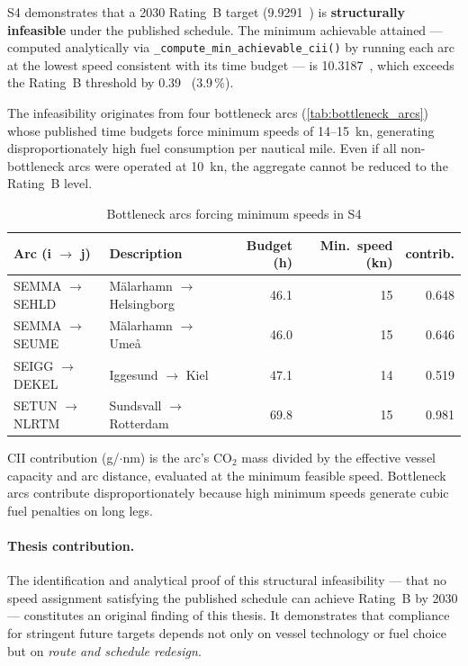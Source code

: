 S4 demonstrates that a 2030 Rating~B \CII{} target (9.9291~\gGTnm{}) is
\textbf{structurally infeasible} under the published schedule.  The minimum
achievable attained \CII{} --- computed analytically via
\texttt{\_compute\_min\_achievable\_cii()} by running each arc at the lowest
speed consistent with its time budget --- is 10.3187~\gGTnm{}, which exceeds
the Rating~B threshold by 0.39~\gGTnm{} (3.9\,\%).

The infeasibility originates from four bottleneck arcs
(\cref{tab:bottleneck_arcs}) whose published time budgets force minimum
speeds of 14--15~kn, generating disproportionately high fuel consumption per
nautical mile.  Even if all non-bottleneck arcs were operated at
10~kn, the aggregate \CII{} cannot be reduced to the Rating~B level.

\begin{table}[h]
\centering
\caption{Bottleneck arcs forcing minimum speeds in S4}
\label{tab:bottleneck_arcs_s4}
\begin{tabular}{llrrr}
  \toprule
  Arc (i $\to$ j) & Description & {Budget (h)} & {Min.\ speed (kn)} & {\CII{} contrib.} \\
  \midrule
  SEMMA $\to$ SEHLD & Mälarhamn $\to$ Helsingborg & 46.1 & 15 & 0.648 \\
  SEMMA $\to$ SEUME & Mälarhamn $\to$ Umeå        & 46.0 & 15 & 0.646 \\
  SEIGG $\to$ DEKEL & Iggesund $\to$ Kiel         & 47.1 & 14 & 0.519 \\
  SETUN $\to$ NLRTM & Sundsvall $\to$ Rotterdam   & 69.8 & 15 & 0.981 \\
  \bottomrule
\end{tabular}
\end{table}

CII contribution (g/\GT{}$\cdot$nm) is the arc's CO$_2$ mass divided by
the effective vessel capacity and arc distance, evaluated at the minimum
feasible speed.  Bottleneck arcs contribute disproportionately because high
minimum speeds generate cubic fuel penalties on long legs.

\paragraph{Thesis contribution.}
The identification and analytical proof of this structural infeasibility ---
that no speed assignment satisfying the published schedule can achieve
Rating~B by 2030 --- constitutes an original finding of this thesis.  It
demonstrates that \CII{} compliance for stringent future targets depends not
only on vessel technology or fuel choice but on \emph{route and schedule
redesign}.

